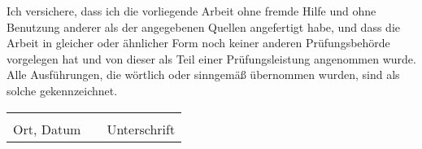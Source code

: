 Ich versichere, dass ich die vorliegende Arbeit ohne fremde Hilfe und ohne Benutzung anderer als der angegebenen Quellen angefertigt habe, und dass die Arbeit in gleicher oder ähnlicher Form noch keiner anderen Prüfungsbehörde vorgelegen hat und von dieser als Teil einer Prüfungsleistung angenommen wurde. Alle Ausführungen, die wörtlich oder sinngemäß übernommen wurden, sind als solche gekennzeichnet.
\vskip 0.5cm

\begin{table}[!htb]
\centering
\begin{tabularx}{\textwidth}{lXl}

       \hspace{6cm} &  & \hspace{6cm} \\
\cline{1-1}\cline{3-3}
Ort, Datum  &  & Unterschrift
\end{tabularx}
\end{table}